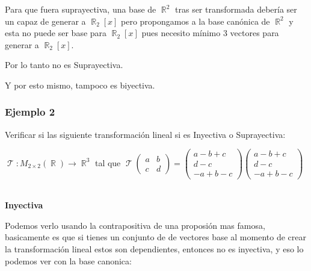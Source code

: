 \documentclass[12pt]{report}                                    %
\DeclareMathOperator \Real {\mathbb{R}}                         %
\DeclareMathOperator \LinealTransformation {\mathcal{T}}        %
\DeclareMathOperator \LT {\mathcal{T}}                          %
\newcommand{\pVector}[1]{                                       %
        \ensuremath{\begin{pmatrix}#1\end{pmatrix}}                 %
    }
\begin{document}
            Para que fuera suprayectiva, una base de $\Real^2$ tras ser transformada debería ser un capaz de
            generar a $\Real_2[x]$ pero propongamos a la base canónica de $\Real^2$ y esta no puede
            ser base para $\Real_2[x]$ pues necesito mínimo 3 vectores para generar a $\Real_2[x]$.

            Por lo tanto no es Suprayectiva.

            Y por esto mismo, tampoco es biyectiva.

            \clearpage
            \subsubsection{\large Ejemplo 2}
            Verificar si las siguiente transformación lineal si es Inyectiva o Suprayectiva:

            $\LinealTransformation : M_{2 \times 2}(\Real) \to \Real^3$ tal que 
            $\LT \pVector{a&b\\c&d} = \pVector{a-b+c\\d-c\\-a+b-c} \begin{pmatrix}a-b+c\\d-c\\-a+b-c\end{pmatrix}$

            \textbf{\\Inyectiva}

            Podemos verlo usando la contrapositiva de una proposión mas famosa, basicamente es que si
            tienes un conjunto de de vectores base al momento de crear la transformación lineal estos son dependientes, 
            entonces no es inyectiva, y eso lo podemos ver con la base canonica:
\end{document}
